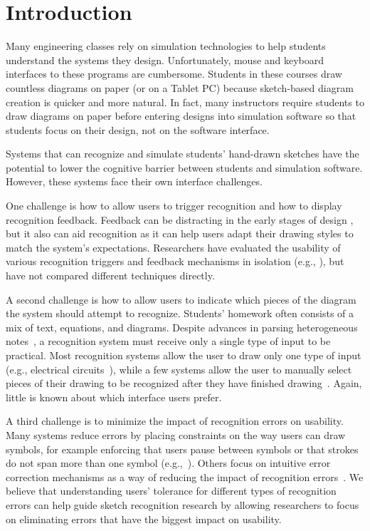 \documentclass{elsart}
\begin{document}
\section{Introduction}

Many engineering classes rely on simulation technologies to help
students understand the systems they design.  Unfortunately, mouse and
keyboard interfaces to these programs are cumbersome.  Students in
these courses draw countless diagrams on paper (or on a Tablet PC)
because sketch-based diagram creation is quicker and more natural.  
In fact, many instructors require students to draw 
diagrams on paper before entering designs into simulation software so
that students focus on their design, not on the software interface.

Systems that can recognize and simulate students' hand-drawn sketches
have the potential to lower the cognitive barrier between students and
simulation software.  However, these systems face their own interface
challenges.

One challenge is how to allow users to trigger recognition and how to
display recognition feedback.  Feedback can be distracting in the
early stages of design \cite{Hong2002Sketch}, but it also can aid
recognition as it can help users adapt their drawing styles to match
the system's expectations.  Researchers have evaluated the usability
of various recognition triggers and feedback mechanisms in isolation
(e.g.,
\cite{Alvarado2001Preserving,Newman2003Denim,LaViola2006Initial}), but
have not compared different techniques directly.

A second challenge is how to allow users to indicate which pieces
of the diagram the system should attempt to recognize.  Students'
homework often consists of a mix of text, equations, and
diagrams. Despite advances in parsing heterogeneous
notes~\cite{Wang2006Parsing}, a recognition system must receive only a
single type of input to be practical.  Most recognition systems allow
the user to draw only one type of input (e.g., electrical
circuits~\cite{Gennari2005Combining}), while a few systems allow the
user to manually select pieces of their drawing to be recognized after
they have finished drawing~\cite{LaViola2006Initial}.  Again, little
is known about which interface users prefer.

A third challenge is to minimize the impact of recognition errors on
usability.  Many systems reduce errors by placing constraints on the
way users can draw symbols, for example enforcing that users pause
between symbols or that strokes do not span more than one symbol
(e.g.,~\cite{Tenneson2005ChemPad,Gennari2005Combining,Hse2005Recognition,Alvarado2004SketchRead}).
Others focus on intuitive error correction mechanisms as a way of
reducing the impact of recognition errors~\cite{Mankoff2000Providing}.
We believe that understanding users' tolerance for different types of
recognition errors can help guide sketch recognition research by
allowing researchers to focus on eliminating errors that have the
biggest impact on usability.
\end{document}

